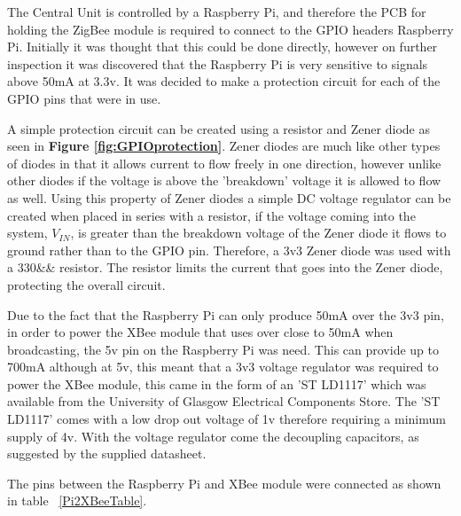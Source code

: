 

The Central Unit is controlled by a Raspberry Pi, and therefore the PCB for holding the ZigBee module is required to connect to the GPIO headers Raspberry Pi.  Initially it was thought that this could be done directly, however on further inspection it was discovered that the Raspberry Pi is very sensitive to signals above 50mA at 3.3v. It was decided to make a protection circuit for each of the GPIO pins that were in use. 

A simple protection circuit can be created using a resistor and Zener diode as seen in \textbf{Figure \ref{fig:GPIOprotection}}.  Zener diodes are much like other types of diodes in that it allows current to flow freely in one direction, however unlike other diodes if the voltage is above the 'breakdown' voltage it is allowed to flow as well. Using this property of Zener diodes a simple DC voltage regulator can be created when placed in series with a resistor, if the voltage coming into the system, \(V_{IN}\), is greater than the breakdown voltage of the Zener diode it flows to ground rather than to the GPIO pin. Therefore, a 3v3 Zener diode was used with a 330&\Omega& resistor. The resistor limits the current that goes into the Zener diode, protecting the overall circuit.

Due to the fact that the Raspberry Pi can only produce 50mA over the 3v3 pin, in order to power the XBee module that uses over close to 50mA when broadcasting, the 5v pin on the Raspberry Pi was need. This can provide up to 700mA although at 5v, this meant that a 3v3 voltage regulator was required to power the XBee module, this came in the form of an 'ST LD1117' which was available from the University of Glasgow Electrical Components Store. The 'ST LD1117' comes with a low drop out voltage of 1v therefore requiring a minimum supply of 4v. With the voltage regulator come the decoupling capacitors, as suggested by the supplied datasheet.

The pins between the Raspberry Pi and XBee module were connected as shown in table ~\ref{Pi2XBeeTable}.


